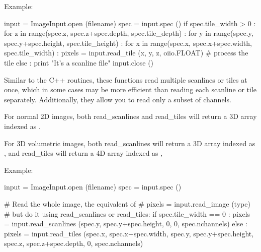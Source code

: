 \noindent Example:
\begin{code}
    input = ImageInput.open (filename)
    spec = input.spec ()
    if spec.tile_width > 0 :
        for z in range(spec.z, spec.z+spec.depth, spec.tile_depth) :
            for y in range(spec.y, spec.y+spec.height, spec.tile_height) :
                for x in range(spec.x, spec.x+spec.width, spec.tile_width) :
                    pixels = input.read_tile (x, y, z, oiio.FLOAT)
                    # process the tile
    else :
        print "It's a scanline file"
    input.close ()
\end{code}
\apiend

Similar to the C++ routines, these functions read multiple scanlines or
tiles at once, which in some cases may be more efficient than reading
each scanline or tile separately.  Additionally, they allow you to read only
a subset of channels.

For normal 2D images, both {\cf read_scanlines} and {\cf read_tiles} will
return a 3D array indexed as {\cf [z][y][x][channel]}.

For 3D volumetric images, both {\cf read_scanlines} will return a 3D array
indexed as {\cf [y][x][channel]}, and {\cf read_tiles} will return a 4D
array indexed as {\cf [z][y][x][channel]},

\noindent Example:
\begin{code}
    input = ImageInput.open (filename)
    spec = input.spec ()

    # Read the whole image, the equivalent of
    #     pixels = input.read_image (type)
    # but do it using read_scanlines or read_tiles:
    if spec.tile_width == 0 :
        pixels = input.read_scanlines (spec.y, spec.y+spec.height, 0,
                                       0, spec.nchannels)
    else :
        pixels = input.read_tiles (spec.x, spec.x+spec.width,
                                   spec.y, spec.y+spec.height,
                                   spec.z, spec.z+spec.depth,
                                   0, spec.nchannels)
\end{code}
\apiend

